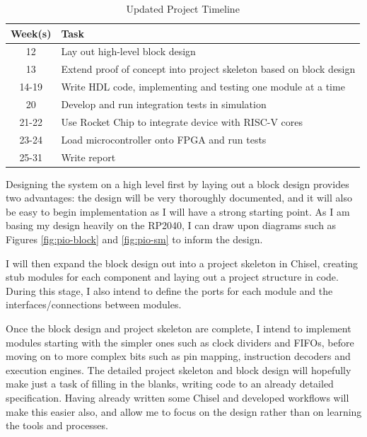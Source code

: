 \documentclass[a4paper,fleqn,12pt]{article}
\begin{document}
\begin{table}[ht!]
	\centering
	\begin{tabular}{|c|l|}
		\hline
		\textbf{Week(s)} & \textbf{Task}                                                       \\ \hline
		12               & Lay out high-level block design                                     \\ \hline
		13               & Extend proof of concept into project skeleton based on block design \\ \hline
		14-19            & Write HDL code, implementing and testing one module at a time       \\ \hline
		20               & Develop and run integration tests in simulation                     \\ \hline
		21-22            & Use Rocket Chip to integrate device with RISC-V cores               \\ \hline
		23-24            & Load microcontroller onto FPGA and run tests                        \\ \hline
		25-31            & Write report                                                        \\ \hline
	\end{tabular}
	\caption{Updated Project Timeline}
	\label{tab:timeline2}
\end{table}


Designing the system on a high level first by laying out a block design provides two advantages: the design will be very thoroughly documented, and it will also be easy to begin implementation as I will have a strong starting point. As I am basing my design heavily on the RP2040, I can draw upon diagrams such as Figures \ref{fig:pio-block} and \ref{fig:pio-sm} to inform the design.

I will then expand the block design out into a project skeleton in Chisel, creating stub modules for each component and laying out a project structure in code. During this stage, I also intend to define the ports for each module and the interfaces/connections between modules.

Once the block design and project skeleton are complete, I intend to implement modules starting with the simpler ones such as clock dividers and FIFOs, before moving on to more complex bits such as pin mapping, instruction decoders and execution engines. The detailed project skeleton and block design will hopefully make just a task of filling in the blanks, writing code to an already detailed specification. Having already written some Chisel and developed workflows will make this easier also, and allow me to focus on the design rather than on learning the tools and processes.
\end{document}
